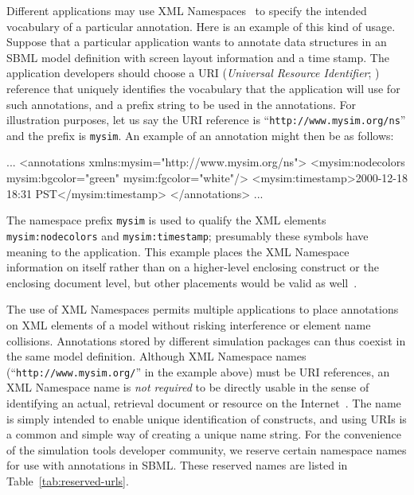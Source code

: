 \documentclass[10pt]{cekarticle}
\newcommand{\vref}[1]{\ref{#1}}
\begin{document}
Different applications may use XML Namespaces~\citep{bray:1999} to specify
the intended vocabulary of a particular annotation.  Here is an example of
this kind of usage.  Suppose that a particular application wants to
annotate data structures in an SBML model definition with screen layout
information and a time stamp.  The application developers should choose a
URI (\emph{Universal Resource Identifier}; \citealt{harold:2001,w3c:2000})
reference that uniquely identifies the vocabulary that the
application will use for such annotations, and a prefix string to be used
in the annotations.  For illustration purposes, let us say the URI
reference is ``\texttt{http://www.mysim.org/ns}'' and the prefix is
\texttt{mysim}.  An example of an annotation might then be as follows:

\begin{example}
...
<annotations xmlns:mysim="http://www.mysim.org/ns">
    <mysim:nodecolors mysim:bgcolor="green" mysim:fgcolor="white"/>
    <mysim:timestamp>2000-12-18 18:31 PST</mysim:timestamp>
</annotations>
...
\end{example}

The namespace prefix \texttt{mysim} is used to qualify the XML elements
\texttt{mysim:nodecolors} and \texttt{mysim:timestamp}; presumably these
symbols have meaning to the application.  This example places the XML
Namespace information on  itself rather than on a
higher-level enclosing construct or the enclosing document level, but other
placements would be valid as well~\citep{bray:1999}.

The use of XML Namespaces permits multiple applications to place
annotations on XML elements of a model without risking interference or
element name collisions.  Annotations stored by different simulation
packages can thus coexist in the same model definition.  Although XML
Namespace names (``\texttt{http://www.mysim.org/}'' in the example above)
must be URI references, an XML Namespace name is \emph{not required} to be
directly usable in the sense of identifying an actual, retrieval document
or resource on the Internet~\citep{bray:1999}.  The name is simply intended
to enable unique identification of constructs, and using URIs is a common
and simple way of creating a unique name string.  For the convenience of
the simulation tools developer community, we reserve certain namespace
names for use with annotations in SBML.  These reserved names are listed in
Table~\vref{tab:reserved-urls}.
\end{document}
